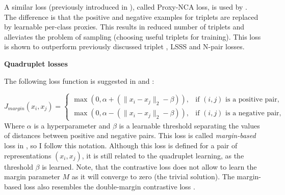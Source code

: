 A similar loss (previously introduced in \citep{goldberger2005neighbourhood,globerson2006metric}), called Proxy-NCA loss, is used by \citep{movshovitz2017no}. The difference is that the positive and negative examples for triplets are replaced by learnable per-class proxies. This results in reduced number of triplets and alleviates the problem of sampling (choosing useful triplets for training). This loss is shown to outperform previously discussed triplet , LSSS  and N-pair  losses.



\bigskip\indent\textbf{Quadruplet losses}

The following loss function is suggested in \citep{Tadmor2016LearningAM} and \citep{wu2017sampling}:

\begin{equation}
\label{eq:margin}
J_{margin}(x_i, x_j) = \begin{cases}  \max(0,\alpha + (\| x_i - x_j \|_{2} - \beta)), & \text{if $(i,j)$ is a positive pair,} &\\  \max(0,\alpha - (\| x_i - x_j \|_{2} - \beta)), & \text{if $(i,j)$ is a negative pair,}\end{cases}
\end{equation}
Where $\alpha$ is a hyperparameter and $\beta$ is a learnable threshold separating the values of distances between positive and negative pairs. This loss is called \textit{margin-based} loss in  \citep{wu2017sampling}, so I follow this notation. Although this loss is defined for a pair of representations $(x_i, x_j)$, it is still related to the quadruplet learning, as the threshold $\beta$ is learned. Note, that the contrastive loss  does not allow to learn the margin parameter $M$ as it will converge to zero (the trivial solution). The margin-based loss  also resembles the double-margin contrastive loss .%




